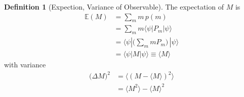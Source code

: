 \documentclass{article}
\theoremstyle{definition}
\newtheorem{definition}{Definition}[section]
\begin{document}
  \begin{definition}[Expection, Variance of Observable]
    The expectation of $M$ is
    \begin{align*}
      \mathbb{E}(M) & = \sum_m m\, p(m) \\
      & = \sum_m m \langle \psi | P_m | \psi \rangle \\
      & = \langle \psi | \bigg( \sum_m m P_m \bigg) \, | \psi \rangle \\
      & = \langle \psi | M | \psi \rangle \equiv \langle M \rangle
    \end{align*}
    with variance
    \begin{align*}
      \big( \Delta M\big)^2 & = \langle (M - \langle M \rangle )^2 \rangle \\
      & = \langle M^2 \rangle - \langle M \rangle^2
    \end{align*} 
  \end{definition}
\end{document}
